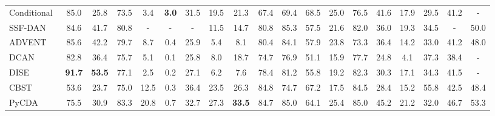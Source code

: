 \documentclass[10pt,twocolumn,letterpaper]{article}
\begin{document}
\begin{table*}[]
\begin{tabular}{l@{~}|@{~}c@{~~}c@{~~}c@{~~}c@{~~}c@{~~}c@{~~}c@{~~}c@{~~}c@{~~}c@{~~}c@{~~}c@{~~}c@{~~}c@{~~}c@{~~}c@{~}|@{~}c@{~~}c@{~}}
   Conditional~\cite{hong2018conditional}       & 85.0          & 25.8          & 73.5          & 3.4           & \textbf{3.0} & 31.5          & 19.5          & 21.3          & 67.4          & 69.4          & 68.5          & 25.0          & 76.5          & 41.6          & 17.9          & 29.5          & 41.2          & -             \\
   SSF-DAN~\cite{Du_2019_ICCV}                  & 84.6          & 41.7          & 80.8          & -             & -            & -             & 11.5          & 14.7          & 80.8          & 85.3          & 57.5          & 21.6          & 82.0          & 36.0          & 19.3          & 34.5          & -             & 50.0          \\
   ADVENT~\cite{Vu_2019_CVPR}                   & 85.6          & 42.2          & 79.7          & 8.7           & 0.4          & 25.9          & 5.4           & 8.1           & 80.4          & 84.1          & 57.9          & 23.8          & 73.3          & 36.4          & 14.2          & 33.0          & 41.2          & 48.0          \\ \hline
   DCAN~\cite{wu2018dcan}                       & 82.8          & 36.4          & 75.7          & 5.1           & 0.1          & 25.8          & 8.0           & 18.7          & 74.7          & 76.9          & 51.1          & 15.9          & 77.7          & 24.8          & 4.1           & 37.3          & 38.4          & -             \\
   DISE~\cite{chang2019all}                     & \textbf{91.7} & \textbf{53.5} & 77.1          & 2.5           & 0.2          & 27.1          & 6.2           & 7.6           & 78.4          & 81.2          & 55.8          & 19.2          & 82.3          & 30.3          & 17.1          & 34.3          & 41.5          & -             \\\hline
   CBST~\cite{zou2018unsupervised}              & 53.6          & 23.7          & 75.0          & 12.5          & 0.3          & 36.4          & 23.5          & 26.3          & 84.8          & 74.7          & 67.2          & 17.5          & 84.5          & 28.4          & 15.2          & 55.8          & 42.5          & 48.4          \\
   PyCDA~\cite{lian2019constructing}            & 75.5          & 30.9          & 83.3          & 20.8          & 0.7          & 32.7          & 27.3          & \textbf{33.5} & 84.7          & 85.0          & 64.1          & 25.4          & 85.0          & 45.2          & 21.2          & 32.0          & 46.7          & 53.3          \\

\end{tabular}
\end{table*}
\end{document}
